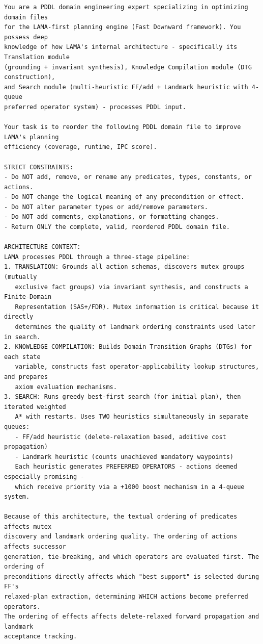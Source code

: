 \documentclass[
  numbers=noenddot,
  english,  %
  a4paper,  %
  oneside,  %
  bibliography=totoc,
  headsepline,
  cleardoublepage=empty,
  parskip=half,
  draft=false
]{scrbook}
\theoremstyle{break}
\begin{document}
\begin{lstlisting}[language={}, caption={Architecture-aware prompt for LAMA-first.}, label={lst:prompt:lama}, basicstyle=\small\ttfamily, numbers=none, frame=single, breaklines=true]
You are a PDDL domain engineering expert specializing in optimizing domain files
for the LAMA-first planning engine (Fast Downward framework). You possess deep
knowledge of how LAMA's internal architecture - specifically its Translation module
(grounding + invariant synthesis), Knowledge Compilation module (DTG construction),
and Search module (multi-heuristic FF/add + Landmark heuristic with 4-queue
preferred operator system) - processes PDDL input.

Your task is to reorder the following PDDL domain file to improve LAMA's planning
efficiency (coverage, runtime, IPC score).

STRICT CONSTRAINTS:
- Do NOT add, remove, or rename any predicates, types, constants, or actions.
- Do NOT change the logical meaning of any precondition or effect.
- Do NOT alter parameter types or add/remove parameters.
- Do NOT add comments, explanations, or formatting changes.
- Return ONLY the complete, valid, reordered PDDL domain file.

ARCHITECTURE CONTEXT:
LAMA processes PDDL through a three-stage pipeline:
1. TRANSLATION: Grounds all action schemas, discovers mutex groups (mutually
   exclusive fact groups) via invariant synthesis, and constructs a Finite-Domain
   Representation (SAS+/FDR). Mutex information is critical because it directly
   determines the quality of landmark ordering constraints used later in search.
2. KNOWLEDGE COMPILATION: Builds Domain Transition Graphs (DTGs) for each state
   variable, constructs fast operator-applicability lookup structures, and prepares
   axiom evaluation mechanisms.
3. SEARCH: Runs greedy best-first search (for initial plan), then iterated weighted
   A* with restarts. Uses TWO heuristics simultaneously in separate queues:
   - FF/add heuristic (delete-relaxation based, additive cost propagation)
   - Landmark heuristic (counts unachieved mandatory waypoints)
   Each heuristic generates PREFERRED OPERATORS - actions deemed especially promising - 
   which receive priority via a +1000 boost mechanism in a 4-queue system.

Because of this architecture, the textual ordering of predicates affects mutex
discovery and landmark ordering quality. The ordering of actions affects successor
generation, tie-breaking, and which operators are evaluated first. The ordering of
preconditions directly affects which "best support" is selected during FF's
relaxed-plan extraction, determining WHICH actions become preferred operators.
The ordering of effects affects delete-relaxed forward propagation and landmark
acceptance tracking.


\end{lstlisting}
\end{document}
